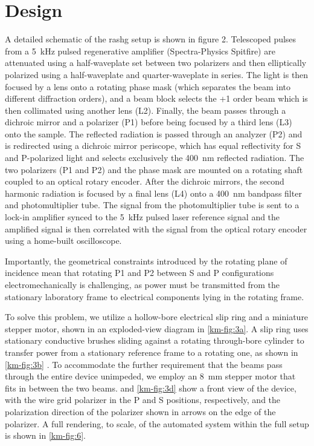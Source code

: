 \section{Design}
\label{sec:des}

A detailed schematic of the \gls{rashg} setup is shown in figure 2.
Telescoped pulses from a \qty{5}{kHz} pulsed regenerative amplifier (Spectra-Physics Spitfire) are attenuated using a half-waveplate set between two polarizers and then elliptically polarized using a half-waveplate and quarter-waveplate in series. 
The light is then focused by a lens onto a rotating phase mask (which separates the beam into different diffraction orders), and a beam block selects the +1 order beam which is then collimated using another lens (L2).
Finally, the beam passes through a dichroic mirror and a polarizer (P1) before being focused by a third lens (L3) onto the sample.
The reflected radiation is passed through an analyzer (P2) and is redirected using a dichroic mirror periscope, which has equal reflectivity for S and P-polarized light and selects exclusively the \qty{400}{nm} reflected radiation.
The two polarizers (P1 and P2) and the phase mask are mounted on a rotating shaft coupled to an optical rotary encoder.
After the dichroic mirrors, the second harmonic radiation is focused by a final lens (L4) onto a \qty{400}{nm} bandpass filter and photomultiplier tube.
The signal from the photomultiplier tube is sent to a lock-in amplifier synced to the \qty{5}{kHz} pulsed laser reference signal and the amplified signal is then correlated with the signal from the optical rotary encoder using a home-built oscilloscope. 

Importantly, the geometrical constraints introduced by the rotating plane of incidence mean that rotating P1 and P2 between S and P configurations electromechanically is challenging, as power must be transmitted from the stationary laboratory frame to electrical components lying in the rotating frame.

To solve this problem, we utilize a hollow-bore electrical slip ring and a miniature stepper motor, shown in an exploded-view diagram in \cref{km-fig:3a}.
A slip ring uses stationary conductive brushes sliding against a rotating through-bore cylinder to transfer power from a stationary reference frame to a rotating one, as shown in \cref{km-fig:3b} \citep{argibay_asymmetric_2010}. 
To accommodate the further requirement that the beams pass through the entire device unimpeded, we employ an \qty{8}{mm} stepper motor that fits in between the two beams.
 and \cref{km-fig:3d} show a front view of the device, with the wire grid polarizer in the P and S positions, respectively, and the polarization direction of the polarizer shown in arrows on the edge of the polarizer.
A full rendering, to scale, of the automated system within the full setup is shown in \cref{km-fig:6}. 

